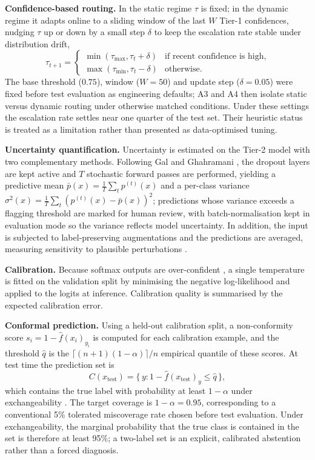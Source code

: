 \documentclass[pdflatex,sn-nature]{sn-jnl}
\begin{document}
\textbf{Confidence-based routing.} In the static regime $\tau$ is fixed; in the dynamic regime it adapts online to a sliding window of the last $W$ Tier-1 confidences, nudging $\tau$ up or down by a small step $\delta$ to keep the escalation rate stable under distribution drift,
\begin{equation}
\tau_{t+1}=
\begin{cases}
\min(\tau_{\max}, \tau_t+\delta) & \text{if recent confidence is high,}\\
\max(\tau_{\min}, \tau_t-\delta) & \text{otherwise.}
\end{cases}
\end{equation}
The base threshold ($0.75$), window ($W=50$) and update step ($\delta=0.05$) were fixed before test evaluation as engineering defaults; A3 and A4 then isolate static versus dynamic routing under otherwise matched conditions. Under these settings the escalation rate settles near one quarter of the test set. Their heuristic status is treated as a limitation rather than presented as data-optimised tuning.

\textbf{Uncertainty quantification.} Uncertainty is estimated on the Tier-2 model with two complementary methods. Following Gal and Ghahramani \cite{gal2016dropout}, the dropout layers are kept active and $T$ stochastic forward passes are performed, yielding a predictive mean $\bar{p}(x)=\tfrac{1}{T}\sum_t p^{(t)}(x)$ and a per-class variance $\sigma^2(x)=\tfrac{1}{T}\sum_t (p^{(t)}(x)-\bar{p}(x))^2$; predictions whose variance exceeds a flagging threshold are marked for human review, with batch-normalisation kept in evaluation mode so the variance reflects model uncertainty. In addition, the input is subjected to label-preserving augmentations and the predictions are averaged, measuring sensitivity to plausible perturbations \cite{wang2019aleatoric}.

\textbf{Calibration.} Because softmax outputs are over-confident \cite{guo2017calibration}, a single temperature is fitted on the validation split by minimising the negative log-likelihood and applied to the logits at inference. Calibration quality is summarised by the expected calibration error.

\textbf{Conformal prediction.} Using a held-out calibration split, a non-conformity score $s_i = 1-\hat{f}(x_i)_{y_i}$ is computed for each calibration example, and the threshold $\hat{q}$ is the $\lceil(n+1)(1-\alpha)\rceil/n$ empirical quantile of these scores. At test time the prediction set is
\begin{equation}
C(x_{\text{test}}) = \{\, y: 1-\hat{f}(x_{\text{test}})_y \le \hat{q}\,\},
\end{equation}
which contains the true label with probability at least $1-\alpha$ under exchangeability \cite{vovk2005algorithmic, shafer2008tutorial}. The target coverage is $1-\alpha=0.95$, corresponding to a conventional 5\% tolerated miscoverage rate chosen before test evaluation. Under exchangeability, the marginal probability that the true class is contained in the set is therefore at least 95\%; a two-label set is an explicit, calibrated abstention rather than a forced diagnosis.
\end{document}
